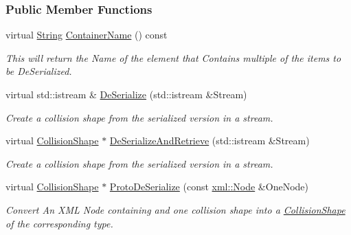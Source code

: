 \subsubsection*{Public Member Functions}
\begin{DoxyCompactItemize}
\item 
virtual \hyperlink{namespaceMezzanine_acf9fcc130e6ebf08e3d8491aebcf1c86}{String} \hyperlink{classMezzanine_1_1CollisionShapeDeSerializer_a84083c617b9c74f3e2110467ade361c3}{ContainerName} () const 
\begin{DoxyCompactList}\small\item\em This will return the Name of the element that Contains multiple of the items to be DeSerialized. \item\end{DoxyCompactList}\item 
virtual std::istream \& \hyperlink{classMezzanine_1_1CollisionShapeDeSerializer_a9b5cc500f61b5df6423102b398267743}{DeSerialize} (std::istream \&Stream)
\begin{DoxyCompactList}\small\item\em Create a collision shape from the serialized version in a stream. \item\end{DoxyCompactList}\item 
virtual \hyperlink{classMezzanine_1_1CollisionShape}{CollisionShape} $\ast$ \hyperlink{classMezzanine_1_1CollisionShapeDeSerializer_a7acb9f3a9c80bf22bb0f84707ba16be8}{DeSerializeAndRetrieve} (std::istream \&Stream)
\begin{DoxyCompactList}\small\item\em Create a collision shape from the serialized version in a stream. \item\end{DoxyCompactList}\item 
virtual \hyperlink{classMezzanine_1_1CollisionShape}{CollisionShape} $\ast$ \hyperlink{classMezzanine_1_1CollisionShapeDeSerializer_af8882919e03c91cd2a65d1a12ddbb85a}{ProtoDeSerialize} (const \hyperlink{classMezzanine_1_1xml_1_1Node}{xml::Node} \&OneNode)
\begin{DoxyCompactList}\small\item\em Convert An XML Node containing and one collision shape into a \hyperlink{classMezzanine_1_1CollisionShape}{CollisionShape} of the corresponding type. \item\end{DoxyCompactList}\end{DoxyCompactItemize}
